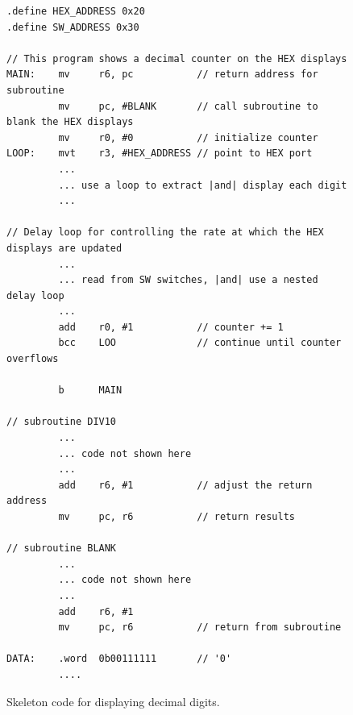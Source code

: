 \documentclass[epsfig,10pt,fullpage]{article} \addtolength{\textwidth}{1.5in}
\begin{document}
\lstset{language=ASM,numbers=none,escapechar=|}
\begin{figure}[H]
\begin{center}
\begin{minipage}[h]{15 cm}
\begin{lstlisting}[name=proc]
.define HEX_ADDRESS 0x20
.define SW_ADDRESS 0x30

// This program shows a decimal counter on the HEX displays
MAIN:    mv     r6, pc           // return address for subroutine
         mv     pc, #BLANK       // call subroutine to blank the HEX displays
         mv     r0, #0           // initialize counter
LOOP:    mvt    r3, #HEX_ADDRESS // point to HEX port
         ...
         ... use a loop to extract |and| display each digit
         ...

// Delay loop for controlling the rate at which the HEX displays are updated
         ...
         ... read from SW switches, |and| use a nested delay loop
         ...
         add    r0, #1           // counter += 1
         bcc    LOO              // continue until counter overflows

         b      MAIN

// subroutine DIV10
         ...
         ... code not shown here
         ...
         add    r6, #1           // adjust the return address
         mv     pc, r6           // return results

// subroutine BLANK
         ...
         ... code not shown here
         ...
         add    r6, #1
         mv     pc, r6           // return from subroutine

DATA:    .word  0b00111111       // '0'
         ....
\end{lstlisting}
\end{minipage}
\caption{Skeleton code for displaying decimal digits.}
\label{fig:part7}
\end{center}
\end{figure}
\end{document}

